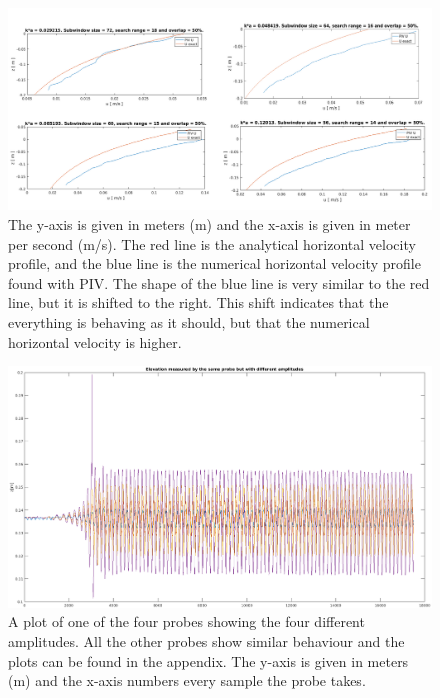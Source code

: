 \documentclass[english,a4paper,12pt]{article}
\begin{document}
\begin{figure}[H]
    \centering
    \includegraphics[width=180mm]{velocity_profiles.png}
    \caption{The y-axis is given in meters (m) and the x-axis is given in meter per second (m/s). The red line is the analytical horizontal velocity profile, and the blue line is the numerical horizontal velocity profile found with PIV. The shape of the blue line is very similar to the red line, but it is shifted to the right. This shift indicates that the everything is behaving as it should, but that the numerical horizontal velocity is higher.}
    \label{fig:4}
\end{figure}

\begin{figure}[H]
    \centering
    \includegraphics[width=160mm]{B_probe.png}
    \caption{A plot of one of the four probes showing the four different amplitudes. All the other probes show similar behaviour and the plots can be found in the appendix. The y-axis is given in meters (m) and the x-axis numbers every sample the probe takes.}
    \label{fig:5}
\end{figure}
\end{document}
